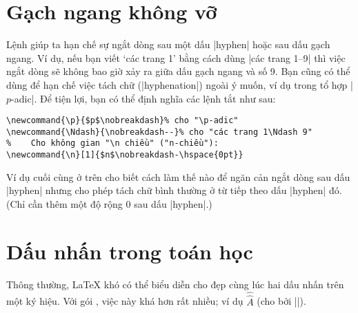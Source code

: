 \section{Gạch ngang không vỡ}

Lệnh  giúp ta hạn chế sự ngắt dòng sau một dấu |hyphen|
hoặc sau dấu gạch ngang.
Ví dụ, nếu bạn viết `các trang 1' bằng cách dùng |các trang 1\nobreakdash--9|
thì việc ngắt dòng sẽ không bao giờ xảy ra giữa dấu gạch ngang và số 9.
Bạn cũng có thể dùng  để hạn chế việc tách chữ (|hyphenation|)
ngoài ý muốn, ví dụ trong tổ hợp |$p$-adic|. Để tiện lợi, bạn có thể định
nghĩa các lệnh tắt như sau:

\medskip
\begin{verbatim}
\newcommand{\p}{$p$\nobreakdash}% cho "\p-adic"
\newcommand{\Ndash}{\nobreakdash--}% cho "các trang 1\Ndash 9"
%    Cho không gian "\n chiều" ("n-chiều"):
\newcommand{\n}[1]{$n$\nobreakdash-\hspace{0pt}}
\end{verbatim}

\medskip
Ví dụ cuối cùng ở trên cho biết cách làm thế nào để ngăn cản ngắt dòng sau dấu
|hyphen| nhưng cho phép tách chữ bình thường ở từ tiếp theo dấu |hyphen| đó.
(Chỉ cần thêm một độ rộng 0 sau dấu |hyphen|.)

\section{Dấu nhấn trong toán học}

Thông thường, \LaTeX{} khó có thể biểu diễn cho đẹp cùng lúc hai dấu nhấn
trên một ký hiệu. Với gói , việc này khá hơn rất nhiều; ví dụ
$\hat{\hat{A}}$ (cho bởi |{}|).

